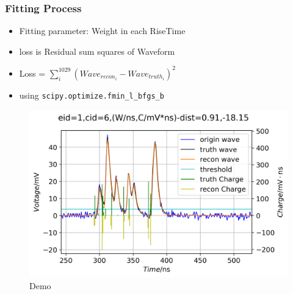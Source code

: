 \documentclass[handout]{beamer}
\begin{document}
\begin{frame}
\frametitle{Fitting Process}
\begin{itemize}
    \item Fitting parameter: Weight in each RiseTime
    \item loss is Residual sum squares of Waveform
    \item Loss = $\sum_{i}^{1029}(Wave_{recon_i}-Wave_{truth_i})^{2}$
    \item using \lstinline{scipy.optimize.fmin_l_bfgs_b}
\end{itemize}
\setlength{\belowcaptionskip}{0mm}
\begin{figure}
    \centering
    \caption{Demo}
    \includegraphics[width=0.7\linewidth]{img/demo.png}
\end{figure}
\end{frame}
\end{document}
